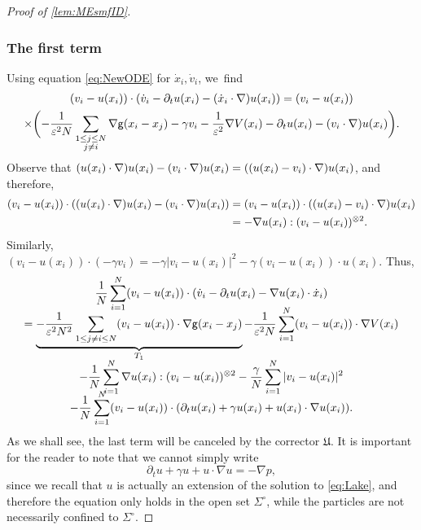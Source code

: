 \documentclass[JEP,XML,SOM,Unicode,published]{cedram}
\newcommand{\Sigmacirc}{\Sigma^\circ}
\theoremstyle{plain}
\theoremstyle{definition}
\DeclarePairedDelimiter{\pa}{\lparen}{\rparen}
\let\ga\gamma
\let\vep\varepsilon
\let\nab\nabla
\let\p\partial
\newcommand{\Uu}{\mathfrak{U}}
\newcommand{\g}{{\mathsf{g}}}
\begin{document}
\begin{proof}[Proof of \cref{lem:MEsmfID}]
\subsubsection*{The first term} Using equation \eqref{eq:NewODE} for $\dot{x}_i, \dot{v}_i$, we~find\vspace*{-5pt}
\begin{multline*}
(v_i - u(x_i))\cdot (\dot{v}_i - \p_t u(x_i) - (\dot{x}_i\cdot\nabla)u(x_i)) = \pa*{v_i- u(x_i)}\\
\times\biggl(-\frac{1}{\vep^2 N}\sum_{\substack{1\leq j\leq N \\ j\neq i}}\nabla\g(x_i-x_j)
-\ga v_i- \frac{1}{\vep^2}\nabla V(x_i) -\p_t u(x_i) - (v_i\cdot\nabla) u(x_i)\biggr).
\end{multline*}
Observe that $(u(x_i)\cdot\nabla)u(x_i) - (v_i\cdot\nabla) u(x_i) = \pa*{(u(x_i)-v_i)\cdot\nabla}u(x_i)$,
and therefore,
\begin{align*}
(v_i-u(x_i)) \cdot \pa*{(u(x_i)\cdot\nabla)u(x_i) - (v_i\cdot\nabla) u(x_i)} &= (v_i-u(x_i)) \cdot\pa*{(u(x_i)-v_i)\cdot\nabla}u(x_i)\\
&= - \nab u(x_i) : (v_i-u(x_i))^{\otimes 2}.
\end{align*}
Similarly, $(v_i-u(x_i))\cdot (-\ga v_i) = -\ga |v_i-u(x_i)|^2 - \ga (v_i-u(x_i))\cdot u(x_i)$.
Thus,\vspace*{-5pt}
\begin{multline}\label{eq:dtkecon}
\frac{1}{N}\sum_{i=1}^N \pa*{v_i - u(x_i)}\cdot \pa*{\dot{v}_i - \p_t u(x_i) - \nabla u(x_i)\cdot \dot{x}_i} \\[-8pt]
= \underbrace{-\frac{1}{\vep^2 N^2}\sum_{1\leq j\neq i\leq N}\pa*{v_i - u(x_i)}\cdot \nabla\g(x_i-x_j)}_{T_1} {-\frac{1}{\vep^2 N}\sum_{i=1}^N \pa*{v_i - u(x_i)}\cdot\nabla V(x_i)}\\[-5pt]
- \frac{1}{N}\sum_{i=1}^N \nab u(x_i): (v_i-u(x_i))^{\otimes2} -\frac{\ga}{N}\sum_{i=1}^N |v_i-u(x_i)|^2 \\[-8pt]
{- \frac{1}{N}\sum_{i=1}^N \pa*{v_i - u(x_i)}\cdot\pa*{\p_t u(x_i) + \ga u(x_i) + u(x_i)\cdot\nabla u(x_i)}}.
\end{multline}
As we shall see, the last term will be canceled by the corrector $\Uu$. It is important for the reader to note that we cannot simply write\vspace*{-3pt}
\begin{equation*}
\p_t u +\ga u + u\cdot\nabla u = -\nabla p,
\end{equation*}
since we recall that $u$ is actually an extension of the solution to \eqref{eq:Lake}, and therefore the equation only holds in the open set $\Sigmacirc$, while the particles are not necessarily confined to $\Sigmacirc$.


\end{proof}
\end{document}
